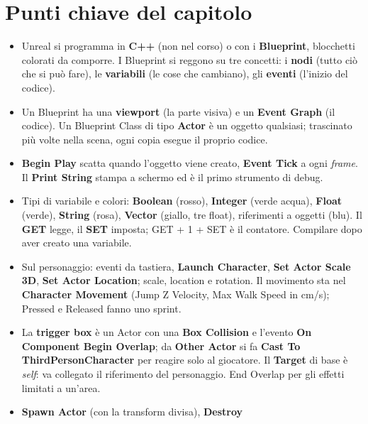 \section*{Punti chiave del capitolo}

\begin{itemize}
  \item Unreal si programma in \textbf{C++} (non nel corso) o con i
        \textbf{Blueprint}, blocchetti colorati da comporre. I Blueprint si
        reggono su tre concetti: i \textbf{nodi} (tutto ciò che si può fare),
        le \textbf{variabili} (le cose che cambiano), gli \textbf{eventi}
        (l'inizio del codice).
  \item Un Blueprint ha una \textbf{viewport} (la parte visiva) e un
        \textbf{Event Graph} (il codice). Un Blueprint Class di tipo
        \textbf{Actor} è un oggetto qualsiasi; trascinato più volte nella
        scena, ogni copia esegue il proprio codice.
  \item \textbf{Begin Play} scatta quando l'oggetto viene creato,
        \textbf{Event Tick} a ogni \emph{frame}. Il \textbf{Print String}
        stampa a schermo ed è il primo strumento di debug.
  \item Tipi di variabile e colori: \textbf{Boolean} (rosso), \textbf{Integer}
        (verde acqua), \textbf{Float} (verde), \textbf{String} (rosa),
        \textbf{Vector} (giallo, tre float), riferimenti a oggetti (blu). Il
        \textbf{GET} legge, il \textbf{SET} imposta; GET + 1 + SET è il
        contatore. Compilare dopo aver creato una variabile.
  \item Sul personaggio: eventi da tastiera, \textbf{Launch Character},
        \textbf{Set Actor Scale 3D}, \textbf{Set Actor Location}; scale,
        location e rotation. Il movimento sta nel \textbf{Character
        Movement} (Jump Z Velocity, Max Walk Speed in cm/s); Pressed e
        Released fanno uno sprint.
  \item La \textbf{trigger box} è un Actor con una \textbf{Box Collision} e
        l'evento \textbf{On Component Begin Overlap}; da \textbf{Other Actor}
        si fa \textbf{Cast To ThirdPersonCharacter} per reagire solo al
        giocatore. Il \textbf{Target} di base è \emph{self}: va collegato il
        riferimento del personaggio. End Overlap per gli effetti limitati a
        un'area.
  \item \textbf{Spawn Actor} (con la transform divisa), \textbf{Destroy
}
\end{itemize}

